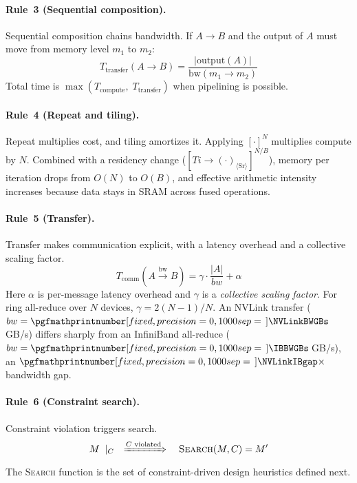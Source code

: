 \documentclass[10pt,twocolumn]{article}
\newcommand{\cvalint}[1]{\pgfmathprintnumber[fixed, precision=0, 1000 sep={\,}]{#1}}
\begin{document}
\paragraph{Rule~3 (Sequential composition).} Sequential composition chains bandwidth. If $A \rightarrow B$ and the output of $A$ must move from memory level $m_1$ to $m_2$:
\begin{equation}
\label{eq:seq-bw}
T_{\text{transfer}}(A \rightarrow B) = \frac{|\text{output}(A)|}{\text{bw}(m_1 \to m_2)}
\end{equation}
Total time is $\max(T_{\text{compute}},\; T_{\text{transfer}})$ when pipelining is possible.

\paragraph{Rule~4 (Repeat and tiling).} Repeat multiplies cost, and tiling amortizes it. Applying $[\cdot]^N$ multiplies compute by $N$. Combined with a residency change ($[Ti \rightarrow (\cdot)_{\langle \text{Sr} \rangle}]^{N/B}$), memory per iteration drops from $O(N)$ to $O(B)$, and effective arithmetic intensity increases because data stays in SRAM across fused operations.

\paragraph{Rule~5 (Transfer).} Transfer makes communication explicit, with a latency overhead and a collective scaling factor.
\begin{equation}
\label{eq:transfer}
T_{\text{comm}}(A \xrightarrow{\text{bw}} B) = \gamma \cdot \frac{|A|}{bw} + \alpha
\end{equation}
Here $\alpha$ is per-message latency overhead and $\gamma$ is a \emph{collective scaling factor}. For ring all-reduce over $N$ devices, $\gamma = 2(N{-}1)/N$. An NVLink transfer ($bw = \cvalint{\NVLinkBWGBs}$\,GB/s) differs sharply from an InfiniBand all-reduce ($bw = \cvalint{\IBBWGBs}$\,GB/s), an $\cvalint{\NVLinkIBgap}\times$ bandwidth gap.

\paragraph{Rule~6 (Constraint search).} Constraint violation triggers search.
\begin{equation}
\label{eq:constraint}
M \;\mid_{C} \quad \xRightarrow{C \text{ violated}} \quad \text{\textsc{Search}}(M, C) = M'
\end{equation}
The \textsc{Search} function is the set of constraint-driven design heuristics defined next.
\end{document}
